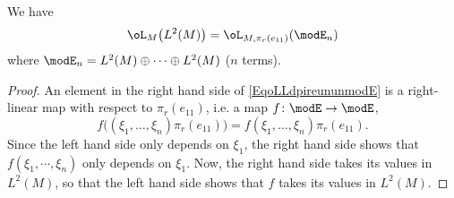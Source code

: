 \begin{lemma}
	We have
	\begin{equation}		\label{EqoLLdpireununmodE}
		\oL_M\big( L^2(M) \big)=\oL_{M,\pi_r(e_{11})}(\modE_n)
	\end{equation}
	where $\modE_n=L^2(M)\oplus \cdots\oplus L^2(M)$ ($n$ terms).
\end{lemma}

\begin{proof}
An element in the right hand side of \eqref{EqoLLdpireununmodE} is a right-linear map with respect to $\pi_r(e_{11})$, i.e. a map $f\colon \modE\to \modE$,
\begin{equation}
	f\big( (\xi_1,\ldots,\xi_n)\pi_r(e_{11}) \big)=f(\xi_1,\ldots,\xi_n)\pi_r(e_{11}).
\end{equation}
Since the left hand side only depends on $\xi_1$, the right hand side  shows that $f(\xi_1,\cdots,\xi_n)$ only depends on $\xi_1$. Now, the right hand side takes its values in $L^2(M)$, so that the left hand side shows that $f$ takes its values in $L^2(M)$.
\end{proof}

